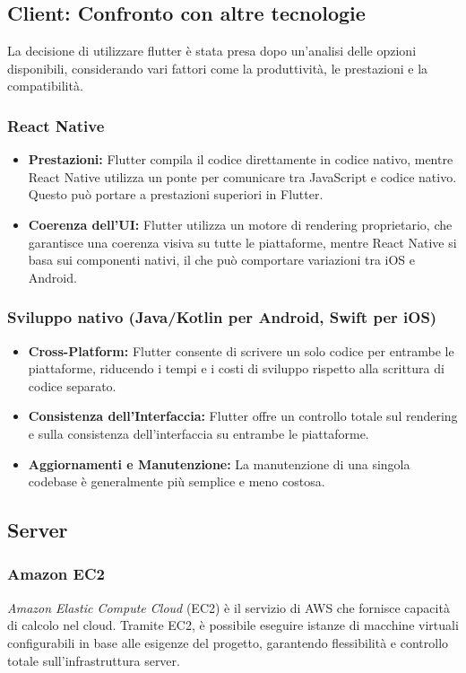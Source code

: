 \subsection{Client: Confronto con altre tecnologie}
La decisione di utilizzare flutter è stata presa dopo un'analisi delle opzioni disponibili, considerando vari fattori come la produttività, le prestazioni e la compatibilità.

\subsubsection{React Native}
\begin{itemize}
    \item \textbf{Prestazioni:} Flutter compila il codice direttamente in codice nativo, mentre React Native utilizza un ponte per comunicare tra JavaScript e codice nativo. Questo può portare a prestazioni superiori in Flutter.
    \item \textbf{Coerenza dell'UI:} Flutter utilizza un motore di rendering proprietario, che garantisce una coerenza visiva su tutte le piattaforme, mentre React Native si basa sui componenti nativi, il che può comportare variazioni tra iOS e Android.
\end{itemize}

\subsubsection{Sviluppo nativo (Java/Kotlin per Android, Swift per iOS)}
\begin{itemize}
    \item \textbf{Cross-Platform:} Flutter consente di scrivere un solo codice per entrambe le piattaforme, riducendo i tempi e i costi di sviluppo rispetto alla scrittura di codice separato.
    \item \textbf{Consistenza dell'Interfaccia:} Flutter offre un controllo totale sul rendering e sulla consistenza dell'interfaccia su entrambe le piattaforme.
    \item \textbf{Aggiornamenti e Manutenzione:} La manutenzione di una singola codebase è generalmente più semplice e meno costosa.
\end{itemize}

\subsection{Server}
\subsubsection{Amazon EC2}
\textit{Amazon Elastic Compute Cloud} (EC2) è il servizio di AWS che fornisce capacità di calcolo nel cloud. 
Tramite EC2, è possibile eseguire istanze di macchine virtuali configurabili in base alle esigenze del progetto, garantendo flessibilità e controllo totale sull'infrastruttura server.

